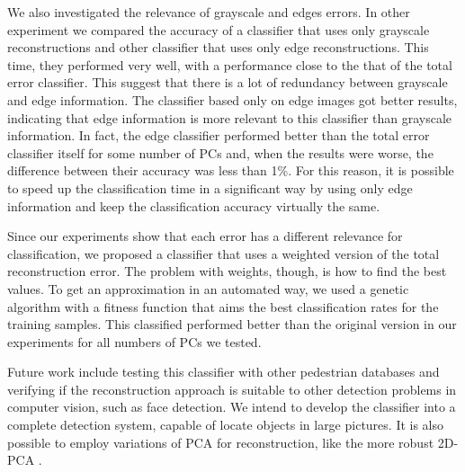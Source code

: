 \documentclass[10pt, conference, compsocconf]{IEEEtran}
\begin{document}
We also investigated the relevance of grayscale and edges errors. In other experiment we compared the accuracy of a classifier that uses only grayscale reconstructions and other classifier that uses only edge reconstructions. This time, they performed very well, with a performance close to the that of the total error classifier. This suggest that there is a lot of redundancy between grayscale and edge information. The classifier based only on edge images got better results, indicating that edge information is more relevant to this classifier than grayscale information. In fact, the edge classifier performed better than the total error classifier itself for some number of PCs and, when the results were worse, the difference between their accuracy was less than 1\%. For this reason, it is possible to speed up the classification time in a significant way by using only edge information and keep the classification accuracy virtually the same.

Since our experiments show that each error has a different relevance for classification, we proposed a classifier that uses a weighted version of the total reconstruction error. The problem with weights, though, is how to find the best values. To get an approximation in an automated way, we used a genetic algorithm with a fitness function that aims the best classification rates for the training samples. This classified performed better than the original version in our experiments for all numbers of PCs we tested. %

Future work include testing this classifier with other pedestrian databases and verifying if the reconstruction approach is suitable to other detection problems in computer vision, such as face detection. We intend to develop the classifier into a complete detection system, capable of locate objects in large pictures. It is also possible to employ variations of PCA for reconstruction, like the more robust 2D-PCA \cite{li05}.





% 
% 
\end{document}
